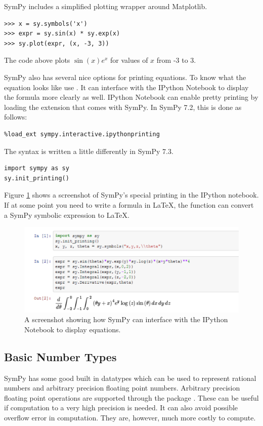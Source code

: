 SymPy includes a simplified plotting wrapper around Matplotlib.
\begin{lstlisting}
>>> x = sy.symbols('x')
>>> expr = sy.sin(x) * sy.exp(x)
>>> sy.plot(expr, (x, -3, 3))
\end{lstlisting}
The code above plots $\sin(x)e^x$ for values of $x$ from -3 to 3.

SymPy also has several nice options for printing equations.
To know what the equation looks like use .
It can interface with the IPython Notebook to display the formula more clearly as well.
IPython Notebook  can enable pretty printing by loading the extension that comes with SymPy.
In SymPy 7.2, this is done as follows:

\begin{lstlisting}
%load_ext sympy.interactive.ipythonprinting
\end{lstlisting}

The syntax is written a little differently in SymPy 7.3.

\begin{lstlisting}
import sympy as sy
sy.init_printing()
\end{lstlisting}

Figure \ref{sympy:pretty_printing} shows a screenshot of SymPy's special printing in the IPython notebook.
If at some point you need to write a formula in \LaTeX, the function  can convert a SymPy symbolic expression to \LaTeX{}.

\begin{figure}[H]
\includegraphics[width=\textwidth]{pretty_printing.pdf}
\caption{A screenshot showing how SymPy can interface with the IPython Notebook to display equations.}
\label{sympy:pretty_printing}
\end{figure}

\subsection*{Basic Number Types}%
SymPy has some good built in datatypes which can be used to represent rational numbers and arbitrary precision floating point numbers.
Arbitrary precision floating point operations are supported through the package .
These can be useful if computation to a very high precision is needed. It can also avoid possible overflow error in computation.
They are, however, much more costly to compute.


